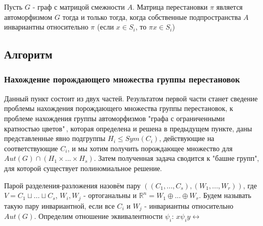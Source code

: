 \begin{lemma}
    Пусть $G$ - граф с матрицой смежности $A$. Матрица перестановки $\pi$ является автоморфизмом $G$ тогда и только тогда, когда собственные подпространства $A$ инвариантны относительно $\pi$ (если $x\in S_i$, то $\pi x \in S_i$)
\end{lemma}

\subsection*{Алгоритм}

\subsubsection*{Нахождение порождающего множества группы перестановок}
Данный пункт состоит из двух частей. Результатом первой части станет сведение проблемы нахождения порождающего множества группы перестановок, к проблеме нахождения группы автоморфизмов "графа с ограниченными кратностью цветов"\,, которая определена и решена в предыдущем пункте, даны представленные явно подгруппы $H_i \leqslant Sym(C_i)$, действующие на соответствующие $C_i$, и мы хотим получить  порождающее множество для $Aut(G) \cap (H_1 \times ... \times H_s)$. Затем полученная задача сводится к "башне групп", для которой существует полиномиальное решение.

Парой разделения-разложения назовём пару $((C_1, ..., C_s), (W_1, ..., W_r))$, где $V = C_1 \sqcup ... \sqcup C_s$, $W_i, W_j$ - ортоганальны и $\mathbb{R}^n = W_1 \oplus ... \oplus W_r$. Будем называть такую пару инвариантной, если все $C_i$ и $W_j$ - инвариантны относительно $Aut(G)$. Определим отношение эквивалентности $\psi_i$: $x\psi_iy \leftrightarrow $

